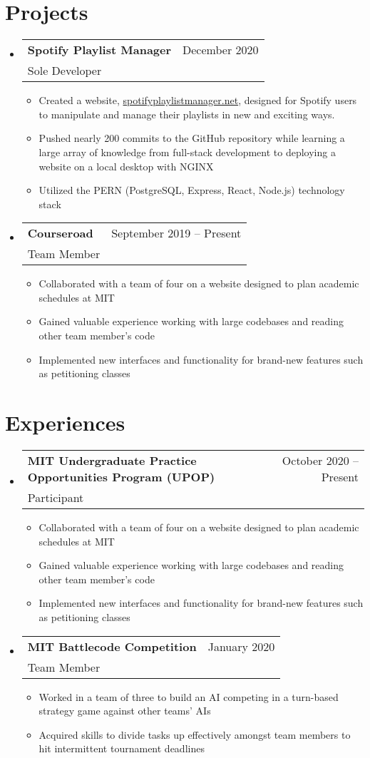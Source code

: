 \documentclass[letterpaper,12pt]{article} %
\makeatletter
\newcommand{\CVItem}[1]{
  \item\small{
    {#1 \vspace{-2pt}}
  }
}
\newcommand{\CVSubheading}[4]{
  \vspace{-2pt}\item
    \begin{tabular*}{0.97\textwidth}[t]{l@{\extracolsep{\fill}}r}
      \textbf{#1} & #2 \\
      \small#3 & \small #4 \\
    \end{tabular*}\vspace{-7pt}
}
\newcommand{\CVSubHeadingListStart}{\begin{itemize}[leftmargin=0.15in, label={}]} %
\newcommand{\CVSubHeadingListEnd}{\end{itemize}}
\newcommand{\CVItemListStart}{\begin{itemize}}
\newcommand{\CVItemListEnd}{\end{itemize}\vspace{-5pt}}
\makeatother
\begin{document}
\section{Projects}
\CVSubHeadingListStart
\CVSubheading
{Spotify Playlist Manager}{December 2020}
{Sole Developer}{}
\CVItemListStart
\CVItem{Created a website, \href{www.spotifyplaylistmanaget.net}{spotifyplaylistmanager.net},
  designed for Spotify users to manipulate and manage their playlists in new and exciting ways.}
\CVItem{Pushed nearly 200 commits to the GitHub repository
  while learning a large array of knowledge from full-stack development to deploying a website on a local desktop with NGINX}
\CVItem{Utilized the PERN (PostgreSQL, Express, React, Node.js) technology stack}
\CVItemListEnd

\CVSubheading
{Courseroad}{September 2019 -- Present}
{Team Member}{}
\CVItemListStart
\CVItem{Collaborated with a team of four on a website designed to plan academic schedules at MIT}
\CVItem{Gained valuable experience working with large codebases and reading other team member's code}
\CVItem{Implemented new interfaces and functionality for brand-new features such as petitioning classes}
\CVItemListEnd
\CVSubHeadingListEnd

\section{Experiences}
\CVSubHeadingListStart
\CVSubheading
{MIT Undergraduate Practice Opportunities Program (UPOP)}{October 2020 -- Present}
{Participant}{}
\CVItemListStart
\CVItem{Collaborated with a team of four on a website designed to plan academic schedules at MIT}
\CVItem{Gained valuable experience working with large codebases and reading other team member's code}
\CVItem{Implemented new interfaces and functionality for brand-new features such as petitioning classes}
\CVItemListEnd

\CVSubheading
{MIT Battlecode Competition}{January 2020}
{Team Member}{}
\CVItemListStart
\CVItem{Worked in a team of three to build an AI competing in a turn-based strategy game against other teams' AIs}
\CVItem{Acquired skills to divide tasks up effectively amongst team members to hit intermittent tournament deadlines}
\CVItemListEnd

\CVSubHeadingListEnd
\end{document}
